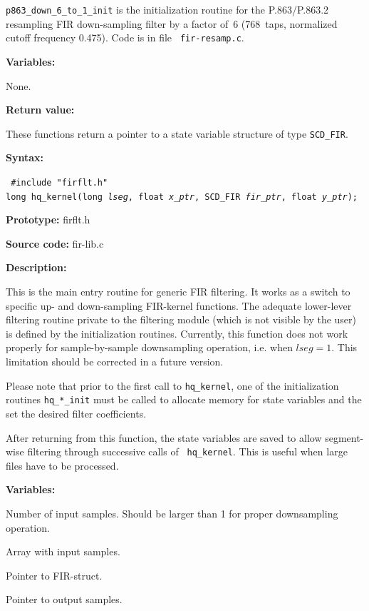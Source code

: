 {\tt p863\_down\_6\_to\_1\_init} is the initialization routine for the
P.863/P.863.2 resampling FIR down-sampling filter by a factor of~6
(768~taps, normalized cutoff frequency 0.475). Code is in file {\tt
fir-resamp.c}.



{\bf Variables: }

None.

{\bf Return value: }

These functions return a pointer to a state variable structure of type
{\tt SCD\_FIR}.



{\bf Syntax: }

{\tt
\#include "firflt.h"\\
long hq\_kernel(long {\em lseg}, float {\em *x\_ptr},
              SCD\_FIR {\em *fir\_ptr},
              float {\em *y\_ptr});
}

{\bf Prototype: }    firflt.h

{\bf Source code: }  fir-lib.c

{\bf Description: }

This is the main entry routine for generic FIR filtering. It works as
a switch to specific up- and down-sampling FIR-kernel functions. The
adequate lower-lever filtering routine private to the filtering module
(which is not visible by the user) is defined by the initialization
routines. Currently, this function does not work properly for
sample-by-sample downsampling operation, i.e. when $lseg=1$. This
limitation should be corrected in a future version.

Please note that prior to the first call to {\tt hq\_kernel}, one of
the initialization routines {\tt hq\_*\_init} must be called
to allocate memory for state variables and the set the desired filter
coefficients.

After returning from this function, the state variables are saved to
allow segment-wise filtering through successive calls of {\tt
hq\_kernel}. This is useful when large files have to be processed.


{\bf Variables: }
\begin{Descr}{\DescrLen}
\item[\pbox{20mm}{\em lseg}] %
        Number of input samples. Should be larger than 1 for proper
        downsampling operation.

\item[\pbox{20mm}{\em x\_ptr}] %
        Array with input samples.

\item[\pbox{20mm}{\em fir\_ptr}] %
        Pointer to FIR-struct.

\item[\pbox{20mm}{\em y\_ptr}] %
        Pointer to output samples.
\end{Descr}

